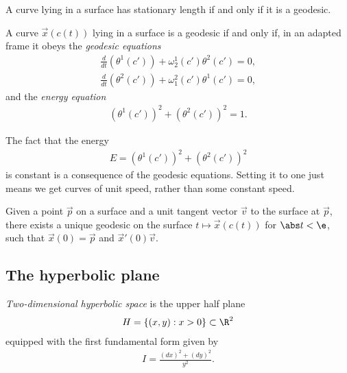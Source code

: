 \documentclass{article}
\begin{document}
\begin{proposition}
    A curve lying in a surface has stationary length if and only if it is a geodesic.
\end{proposition}

\begin{proposition}
    A curve $\vec x(c(t))$ lying in a surface is a geodesic if and only if, in an adapted frame 
    it obeys the \emph{geodesic equations}
    \begin{align*}
        \frac{d}{dt}(\theta^1 (c')) + \omega_2^1(c')\theta^2(c') = 0,\\
        \frac{d}{dt}(\theta^2 (c')) + \omega_1^2(c')\theta^1(c') = 0,
    \end{align*}
    and the \emph{energy equation}
    \begin{align*}
        (\theta^1(c'))^2 + (\theta^2(c'))^2 = 1.
    \end{align*}
\end{proposition}

\begin{proposition}
    The fact that the energy
    \begin{align*}
        E = (\theta^1(c'))^2 + (\theta^2(c'))^2
    \end{align*}
    is constant is a consequence of the geodesic equations. Setting it to one just means we get 
    curves of unit speed, rather than some constant speed.
\end{proposition}

\begin{proposition}
    Given a point $\vec p$ on a surface and a unit tangent vector $\vec v$ to the surface at $\vec p$,
    there exists a unique geodesic on the surface $t\mapsto \vec x(c(t))$ for $\abs t < \e$,
    such that $\vec x(0) =\vec p$ and $\vec x'(0) \vec v$.
\end{proposition}

\subsection{The hyperbolic plane}

\begin{definition}
    \emph{Two-dimensional hyperbolic space} is the upper half plane 
    \begin{align*}
        H = \{(x,y) : x > 0\}\subset\R^2
    \end{align*}
    equipped with the first fundamental form given by 
    \begin{align*}
        I = \frac{(dx)^2 + (dy)^2}{y^2}.
    \end{align*}
\end{definition}
\end{document}
